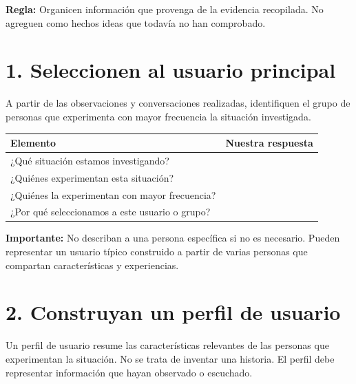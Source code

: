 \documentclass[12pt,a4paper]{article}
\begin{document}
	\textbf{Regla:} Organicen información que provenga de la evidencia recopilada. No agreguen como hechos ideas que todavía no han comprobado.
	
	\vspace{-4mm}
	\section*{1. Seleccionen al usuario principal}
	
	A partir de las observaciones y conversaciones realizadas, identifiquen el grupo de personas que experimenta con mayor frecuencia la situación investigada.
	
	\begin{center}
		\small
		\begin{tabular}{|L{0.55\textwidth}|L{0.4\textwidth}|}
			\hline
			\textbf{Elemento} & \textbf{Nuestra respuesta} \\
			\hline
			¿Qué situación estamos investigando? & \rule{0pt}{0.65cm} \\
			\hline
			¿Quiénes experimentan esta situación? & \rule{0pt}{0.65cm} \\
			\hline
			¿Quiénes la experimentan con mayor frecuencia? & \rule{0pt}{0.65cm} \\
			\hline
			¿Por qué seleccionamos a este usuario o grupo? & \rule{0pt}{0.75cm} \\
			\hline
		\end{tabular}
	\end{center}
	
	\vspace{0.15cm}
	
	\textbf{Importante:} No describan a una persona específica si no es necesario. Pueden representar un usuario típico construido a partir de varias personas que compartan características y experiencias.

	\vspace{-4mm}
	\section*{2. Construyan un perfil de usuario}
	
	Un perfil de usuario resume las características relevantes de las personas que experimentan la situación. No se trata de inventar una historia. El perfil debe representar información que hayan observado o escuchado.
	
\end{document}
